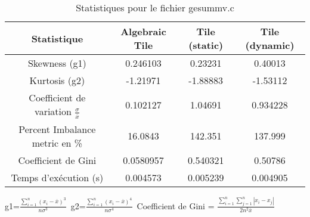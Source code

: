 \documentclass{article}
\begin{document}
\begin{table}[htbp]
  \centering
  \caption{Statistiques pour le fichier gesummv.c}
  \begin{tabular}{|c|c|c|c|}
    \hline
    Statistique & Algebraic Tile & Tile (static) & Tile (dynamic) \\ 
    \hline
    Skewness (g1)  & 0.246103 & 0.23231 & 0.40013 \\ 
    Kurtosis (g2)  & -1.21971 & -1.88883 & -1.53112 \\ 
    Coefficient de variation $ \frac{\sigma}{\overline{x}} $ & 0.102127 & 1.04691 & 0.934228\\ 
    Percent Imbalance metric en \% & 16.0843 & 142.351 & 137.999\\ 
    Coefficient de Gini  & 0.0580957 & 0.540321 & 0.50786\\ 
    Temps d'exécution (s) &  0.004573    &  0.005239   &  0.004905   \\ 

    \hline
  \end{tabular}
\end{table}
g1=$ \frac{\sum_{i=1}^{n} (x_i - \overline{x})^3}{n\sigma^3} $\
g2=$ \frac{\sum_{i=1}^{n} (x_i - \overline{x})^4}{n\sigma^4} $\
Coefficient de Gini = $ \frac{\sum_{i=1}^{n}\sum_{j=1}^{n} |x_i - x_j|}{2n^2\overline{x}} $\
\newpage
\end{document}
